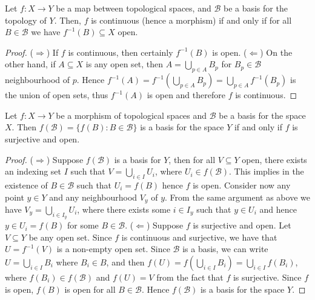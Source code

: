 \begin{proposition}
Let \(f: X \to Y\) be a map between topological spaces, and \(\mathcal B\) be
a basis for the topology of \(Y\). Then, \(f\) is continuous (hence a
morphism) if and only if for all \(B \in \mathcal B\) we have \(f^{-1}(B)
\subseteq X\) open.
\end{proposition}

\begin{proof}
(\(\Rightarrow\)) If \(f\) is continuous, then certainly \(f^{-1}(B)\) is
open. (\(\Leftarrow\)) On the other hand, if \(A \subseteq X\) is any open
set, then \(A = \bigcup_{p \in A} B_p\) for \(B_p \in \mathcal B\)
neighbourhood of \(p\). Hence \(f^{-1}(A) = f^{-1} (\bigcup_{p \in A}
B_p) = \bigcup_{p \in A} f^{-1}(B_p)\) is the union of open sets, thus
\(f^{-1}(A)\) is open and therefore \(f\) is continuous.
\end{proof}

\begin{proposition}\label{prop: basis image surjective}
Let \(f: X \to Y\) be a morphism of topological spaces and \(\mathcal B\) be a
basis for the space \(X\). Then \(f(\mathcal B) = \{f(B) \colon B \in \mathcal
B\}\) is a basis for the space \(Y\) if and only if \(f\) is surjective and
open.
\end{proposition}

\begin{proof}
(\(\Rightarrow\)) Suppose \(f(\mathcal B)\) is a basis for \(Y\), then for all
\(V \subseteq Y\) open, there exists an indexing set \(I\) such that \(V =
\bigcup_{i \in  I} U_i\), where \(U_i \in f(\mathcal B)\). This implies in the
existence of \(B \in \mathcal B\) such that \(U_i = f(B)\) hence \(f\) is
open. Consider now any point \(y \in Y\) and any neighbourhood \(V_y\) of
\(y\). From the same argument as above we have \(V_y = \bigcup_{i \in  I_y}
U_i\), where there exists some \(i \in I_y\) such that \(y \in U_i\) and hence
\(y \in U_i = f(B)\) for some \(B \in \mathcal B\).
(\(\Leftarrow\)) Suppose \(f\) is surjective and open. Let \(V \subseteq Y\)
be any open set. Since \(f\) is continuous and surjective, we have that
\(U = f^{-1}(V)\) is a non-empty open set. Since \(\mathcal B\) is a basis, we
can write \(U = \bigcup_{i \in  I} B_i\) where \(B_i \in B\), and then \(f(U)
= f\left( \bigcup_{i \in  I} B_i \right) = \bigcup_{i \in I} f(B_i)\), where
\(f(B_i) \in f(\mathcal B)\) and \(f(U) = V\) from the fact that \(f\) is
surjective. Since \(f\) is open, \(f(B)\) is open for all \(B \in \mathcal
B\). Hence \(f(\mathcal B)\) is a basis for the space \(Y\).
\end{proof}

